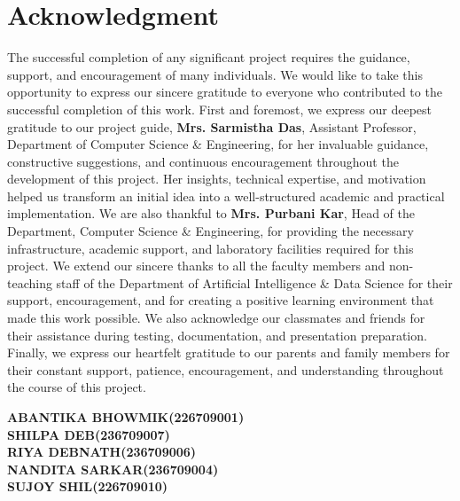 \documentclass[12pt, a4paper]{report}
\begin{document}
\chapter*{Acknowledgment}
The successful completion of any significant project requires the guidance, support, and encouragement of many individuals. We would like to take this opportunity to express our sincere gratitude to everyone who contributed to the successful completion of this work. First and foremost, we express our deepest gratitude to our project guide, \textbf{Mrs. Sarmistha Das}, Assistant Professor, Department of Computer Science \& Engineering, for her invaluable guidance, constructive suggestions, and continuous encouragement throughout the development of this project. Her insights, technical expertise, and motivation helped us transform an initial idea into a well-structured academic and practical implementation. We are also thankful to \textbf{Mrs. Purbani Kar}, Head of the Department, Computer Science \& Engineering, for providing the necessary infrastructure, academic support, and laboratory facilities required for this project. We extend our sincere thanks to all the faculty members and non-teaching staff of the Department of Artificial Intelligence \& Data Science for their support, encouragement, and for creating a positive learning environment that made this work possible. We also acknowledge our classmates and friends for their assistance during testing, documentation, and presentation preparation. Finally, we express our heartfelt gratitude to our parents and family members for their constant support, patience, encouragement, and understanding throughout the course of this project.


\vspace{2cm}
\begin{flushright}
  {\bf ABANTIKA BHOWMIK\quad(226709001)}\\[0.7cm]
  {\bf SHILPA DEB\quad(236709007)}\\[0.7cm]
  {\bf RIYA DEBNATH\quad(236709006)}\\[0.7cm]
  {\bf NANDITA SARKAR\quad(236709004)}\\[0.7cm]
  {\bf SUJOY SHIL\quad(226709010)}
\end{flushright}

\tableofcontents
\listoffigures
\listoftables
\end{document}
